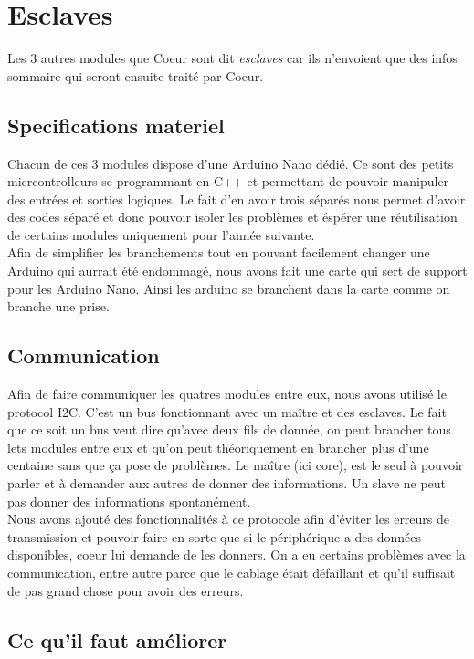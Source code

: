 \chapter{Esclaves}

Les 3 autres modules que Coeur sont dit \textit{esclaves} car ils n'envoient que des infos sommaire qui seront ensuite traité par Coeur.

\section{Specifications materiel}
Chacun de ces 3 modules dispose d'une Arduino Nano dédié. Ce sont des petits micrcontrolleurs se programmant en C++ et permettant de pouvoir manipuler des entrées et sorties logiques. Le fait d'en avoir trois séparés nous permet d'avoir des codes séparé et donc pouvoir isoler les problèmes et éspérer une réutilisation de certains modules uniquement pour l'année suivante.\\

Afin de simplifier les branchements tout en pouvant facilement changer une Arduino qui aurrait été endommagé, nous avons fait une carte qui sert de support pour les Arduino Nano. Ainsi les arduino se branchent dans la carte comme on branche une prise.

\section{Communication}
Afin de faire communiquer les quatres modules entre eux, nous avons utilisé le protocol I2C. C'est un bus fonctionnant avec un maître et des esclaves. Le fait que ce soit un bus veut dire qu'avec deux fils de donnée, on peut brancher tous lets modules entre eux et qu'on peut théoriquement en brancher plus d'une centaine sans que ça pose de problèmes. Le maître (ici core), est le seul à pouvoir parler et à demander aux autres de donner des informations. Un slave ne peut pas donner des informations spontanément.\\

Nous avons ajouté des fonctionnalités à ce protocole afin d'éviter les erreurs de transmission et pouvoir faire en sorte que si le périphérique a des données disponibles, coeur lui demande de les donners. On a eu certains problèmes avec la communication, entre autre parce que le cablage était défaillant et qu'il suffisait de pas grand chose pour avoir des erreurs.

\section{Ce qu'il faut améliorer}
